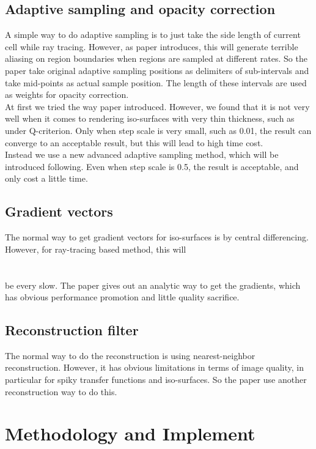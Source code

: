 \documentclass[acmtog]{acmart}
\begin{document}
\subsection{Adaptive sampling and opacity correction}
A simple way to do adaptive sampling is to just take the side length of current cell while ray tracing. However, as paper introduces, this will generate terrible aliasing on region boundaries when regions are sampled at different rates. So the paper take original adaptive sampling positions as delimiters of sub-intervals and take mid-points as actual sample position. The length of these intervals are used as weights for opacity correction.\\
At first we tried the way paper introduced. However, we found that it is not very well when it comes to rendering iso-surfaces with very thin thickness, such as under Q-criterion. Only when step scale is very small, such as 0.01, the result can converge to an acceptable result, but this will lead to high time cost.\\
Instead we use a new advanced adaptive sampling method, which will be introduced following. Even when step scale is 0.5, the result is acceptable, and only cost a little time. 

\subsection{Gradient vectors}
The normal way to get gradient vectors for iso-surfaces is by central differencing. However, for ray-tracing based method, this will \\
\\
\\
be every slow. The paper gives out an analytic way to get the gradients, which has obvious performance promotion and little quality sacrifice.



\subsection{Reconstruction filter}
The normal way to do the reconstruction is using nearest-neighbor reconstruction. However, it has obvious limitations in terms of image quality, in particular for spiky transfer functions and iso-surfaces. So the paper use another reconstruction way to do this.


\section{Methodology and Implement}
\end{document}
